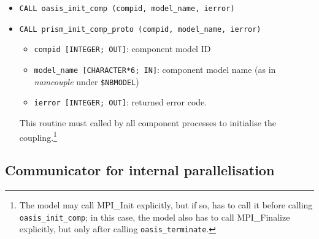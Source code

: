 \begin{itemize}

\item {\tt CALL oasis\_init\_comp (compid, model\_name, ierror)}
\item {\tt CALL prism\_init\_comp\_proto (compid, model\_name,
    ierror)}

  \begin{itemize}
  \item {\tt compid [INTEGER; OUT]}: component model ID
  \item {\tt model\_name [CHARACTER*6; IN]}: component model name (as
    in {\em namcouple} under {\tt \$NBMODEL})
  \item {\tt ierror [INTEGER; OUT]}: returned error code.
  \end{itemize}
 
  This routine must called by all component processes to initialise
  the coupling.\footnote{The model may call MPI\_Init explicitly, but
    if so, has to call it before calling {\tt oasis\_init\_comp}; in
    this case, the model also has to call MPI\_Finalize explicitly,
    but only after calling {\tt oasis\_terminate}.}
\end{itemize}

\subsection{Communicator for internal parallelisation}
\label{subsec_MPI1}

